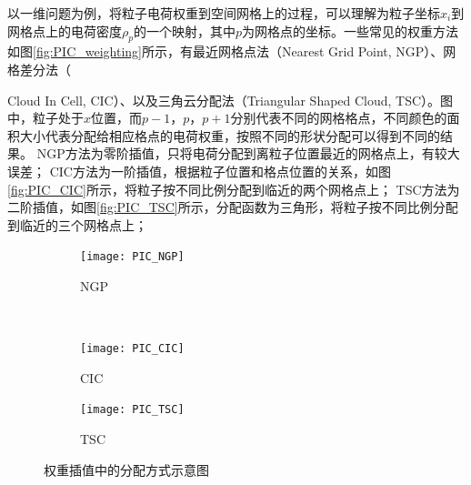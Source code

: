 以一维问题为例，将粒子电荷权重到空间网格上的过程，可以理解为粒子坐标$x_i$到网格点上的电荷密度$\rho_p$的一个映射，其中$p$为网格点的坐标。一些常见的权重方法如图\eqref{fig:PIC_weighting}所示，有最近网格点法（Nearest Grid Point, NGP）、网格差分法（{Cloud In Cell, CIC）、以及三角云分配法（Triangular Shaped Cloud, TSC）。图中，粒子处于$x$位置，而$p-1$，$p$，$p+1$分别代表不同的网格格点，不同颜色的面积大小代表分配给相应格点的电荷权重，按照不同的形状分配可以得到不同的结果。
NGP方法为零阶插值，只将电荷分配到离粒子位置最近的网格点上，有较大误差；
CIC方法为一阶插值，根据粒子位置和格点位置的关系，如图\eqref{fig:PIC_CIC}所示，将粒子按不同比例分配到临近的两个网格点上；
TSC方法为二阶插值，如图\eqref{fig:PIC_TSC}所示，分配函数为三角形，将粒子按不同比例分配到临近的三个网格点上；
\begin{figure}[!htbp]
  \centering
  \begin{subfigure}[b]{0.8\textwidth}
    \texttt{[image: PIC\_NGP]}
    \caption{NGP}
    \label{fig:PIC_NGP}
  \end{subfigure}%
  ~%
  \begin{subfigure}[b]{0.8\textwidth}
    \texttt{[image: PIC\_CIC]}
    \caption{CIC}
    \label{fig:PIC_CIC}
  \end{subfigure}
  \begin{subfigure}[b]{0.8\textwidth}
    \texttt{[image: PIC\_TSC]}
    \caption{TSC}
    \label{fig:PIC_TSC}
  \end{subfigure}%
  \caption{权重插值中的分配方式示意图}
  \label{fig:PIC_weighting}
\end{figure}

}
